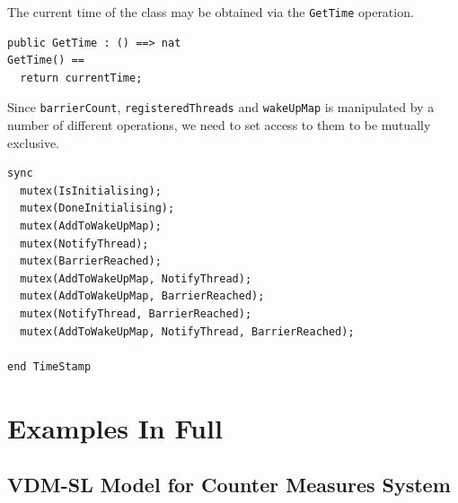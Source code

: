 \documentclass{overturerepchap}
\begin{document}
The current time of the class may be obtained via the \texttt{GetTime}
operation.

\begin{lstlisting}
public GetTime : () ==> nat
GetTime() ==
  return currentTime;
\end{lstlisting}

Since \texttt{barrierCount}, \texttt{registeredThreads} and 
\texttt{wakeUpMap} is manipulated by a number of different
operations, we need to set access to them to be mutually exclusive.

\begin{lstlisting}
sync
  mutex(IsInitialising);
  mutex(DoneInitialising);
  mutex(AddToWakeUpMap);
  mutex(NotifyThread);
  mutex(BarrierReached);
  mutex(AddToWakeUpMap, NotifyThread);
  mutex(AddToWakeUpMap, BarrierReached);
  mutex(NotifyThread, BarrierReached);
  mutex(AddToWakeUpMap, NotifyThread, BarrierReached);

end TimeStamp
\end{lstlisting}
 
\chapter{Examples In Full}\label{app:listing}

\section{VDM-SL Model for Counter Measures System}\label{app:VDMSLmodel}
\end{document}
